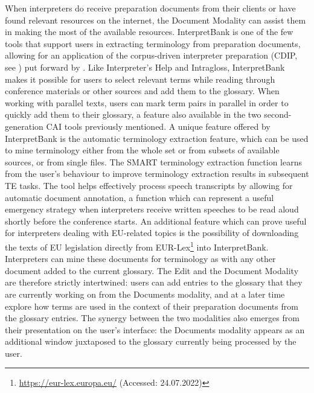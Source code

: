When interpreters do receive preparation documents from their clients or have found relevant resources on the internet, the Document Modality can assist them in making the most of the available resources. InterpretBank is one of the few tools that support users in extracting terminology from preparation documents, allowing for an application of the corpus-driven interpreter preparation (CDIP, see ) put forward by \citet{fantinuoli_specialized_2006}. Like Interpreter's Help and Intragloss, InterpretBank makes it possible for users to select relevant terms while reading through conference materials or other sources and add them to the glossary. When working with parallel texts, users can mark term pairs in parallel in order to quickly add them to their glossary, a feature also available in the two second-generation CAI tools previously mentioned. A unique feature offered by InterpretBank is the automatic terminology extraction feature, which can be used to mine terminology either from the whole set or from subsets of available sources, or from single files. The SMART terminology extraction function learns from the user's behaviour to improve terminology extraction results in subsequent TE tasks. The tool helps effectively process speech transcripts by allowing for automatic document annotation, a function which can represent a useful emergency strategy when interpreters receive written speeches to be read aloud shortly before the conference starts. An additional feature which can prove useful for interpreters dealing with EU-related topics is the possibility of downloading the texts of EU legislation directly from EUR-Lex\footnote{\url{https://eur-lex.europa.eu/} (Accessed: 24.07.2022)} into InterpretBank. Interpreters can mine these documents for terminology as with any other document added to the current glossary. The Edit and the Document Modality are therefore strictly intertwined: users can add entries to the glossary that they are currently working on from the Documents modality, and at a later time explore how terms are used in the context of their preparation documents from the glossary entries. The synergy between the two modalities also emerges from their presentation on the user's interface: the Documents modality appears as an additional window juxtaposed to the glossary currently being processed by the user.

